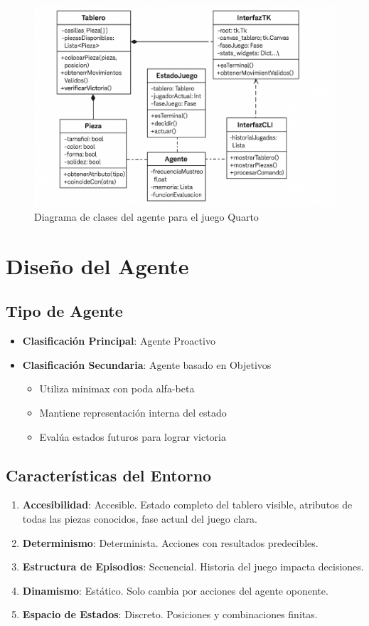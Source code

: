 \documentclass[conference]{IEEEtran}
\begin{document}
\begin{figure}[htbp]
	\centering
	\includegraphics[width=\linewidth]{diagrama-clases.png}
	\caption{Diagrama de clases del agente para el juego Quarto}
	\label{fig:diagrama-clases}
\end{figure}

\section{Diseño del Agente}

\subsection{Tipo de Agente}
\begin{itemize}
	\item \textbf{Clasificación Principal}: Agente Proactivo
	\item \textbf{Clasificación Secundaria}: Agente basado en Objetivos
	\begin{itemize}
		\item Utiliza minimax con poda alfa-beta
		\item Mantiene representación interna del estado
		\item Evalúa estados futuros para lograr victoria
	\end{itemize}
\end{itemize}

\subsection{Características del Entorno}
\begin{enumerate}
	\item \textbf{Accesibilidad}: Accesible. Estado completo del tablero visible, atributos de todas las piezas conocidos, fase actual del juego clara.
	\item \textbf{Determinismo}: Determinista. Acciones con resultados predecibles.
	\item \textbf{Estructura de Episodios}: Secuencial. Historia del juego impacta decisiones.
	\item \textbf{Dinamismo}: Estático. Solo cambia por acciones del agente oponente.
	\item \textbf{Espacio de Estados}: Discreto. Posiciones y combinaciones finitas.
\end{enumerate}
\end{document}
